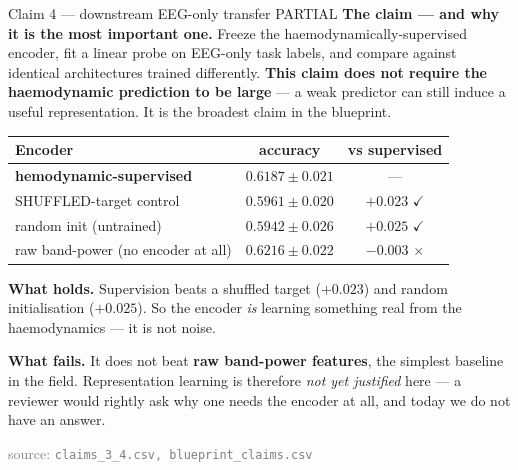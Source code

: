 \documentclass[aspectratio=169,11pt]{beamer}
\newcommand{\yes}{\textcolor{good}{\ensuremath{\checkmark}}}
\newcommand{\no}{\textcolor{bad}{\ensuremath{\times}}}
\newcommand{\src}[1]{{\scriptsize\textcolor{gray}{source: \texttt{#1}}}}
\begin{document}
\begin{frame}{Claim 4 --- downstream EEG-only transfer \quad \textcolor{warn}{PARTIAL}}
\textbf{The claim --- and why it is the most important one.} Freeze the
haemodynamically-supervised encoder, fit a linear probe on EEG-only task labels,
and compare against identical architectures trained differently.
\textbf{This claim does not require the haemodynamic prediction to be large} ---
a weak predictor can still induce a useful representation. It is the broadest
claim in the blueprint.

\begin{center}\small
\begin{tabular}{lcc}
\toprule
Encoder & accuracy & vs supervised \\
\midrule
\textbf{hemodynamic-supervised} & $\mathbf{0.6187 \pm 0.021}$ & --- \\
SHUFFLED-target control        & $0.5961 \pm 0.020$ & $+0.023$ \yes \\
random init (untrained)        & $0.5942 \pm 0.026$ & $+0.025$ \yes \\
\textcolor{bad}{raw band-power (no encoder at all)} & \textcolor{bad}{$\mathbf{0.6216 \pm 0.022}$} & \textcolor{bad}{$-0.003$} \no \\
\bottomrule
\end{tabular}
\end{center}

\vspace{0.5em}
\textbf{What holds.} Supervision beats a shuffled target ($+0.023$) and random
initialisation ($+0.025$). So the encoder \emph{is} learning something real from
the haemodynamics --- it is not noise.

\vspace{0.4em}
\textbf{What fails.} It does not beat \textbf{raw band-power features}, the
simplest baseline in the field. Representation learning is therefore \emph{not
yet justified} here --- a reviewer would rightly ask why one needs the encoder at
all, and today we do not have an answer.

\vspace{0.3em}
\src{claims\_3\_4.csv, blueprint\_claims.csv}
\end{frame}
\end{document}
